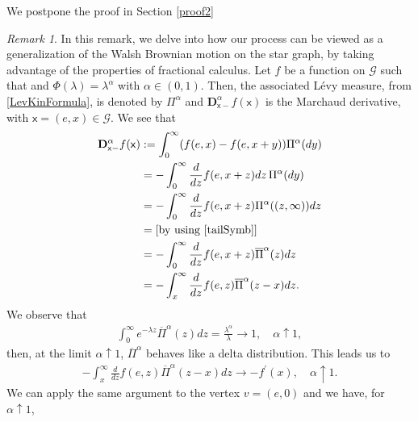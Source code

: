 \documentclass[11pt,a4paper]{article}
\theoremstyle{plain}
\theoremstyle{definition}
\theoremstyle{remark}
\newtheorem{remark}{Remark}
\begin{document}
		We postpone the proof in Section \ref{proof2}
		\begin{remark}
			In this remark, we delve into how our process can be viewed as a generalization of the Walsh Brownian motion on the star graph, by taking advantage of the properties of fractional calculus.
			Let $f$ be a function on $\mathcal{G}$ such that  and $\Phi(\lambda)=\lambda^\alpha$ with $\alpha \in (0,1)$. Then, the associated L\'evy measure, from \eqref{LevKinFormula}, is denoted by $\Pi^\alpha$ and $\mathbf{D}_{\mathsf{x}-}^\alpha f(\mathsf{x})$ is the Marchaud derivative, with $\mathsf{x}=(e,x) \in \mathcal{G}$. We see that
			\begin{align*}
				\mathbf{D}_{\mathsf{x}-}^\alpha f(\mathsf{x})&:=\int_{0}^{\infty} (f(e,x) - f(e,x+y))\Pi^\alpha(dy)\\
				&=- \int_{0}^{\infty} \frac{d}{dz} f(e,x+z) dz \, \Pi^\alpha(dy)\\
				&=-\int_{0}^{\infty} \frac{d}{dz} f(e,x+z) \Pi^\alpha((z,\infty)) dz\\
				&=\text{[by using \eqref{tailSymb}]}\\
				&=-\int_{0}^{\infty} \frac{d}{dz} f(e,x+z) \overline{\Pi}^\alpha (z) dz\\
				&=-\int_{x}^{\infty} \frac{d}{dz} f(e,z) \overline{\Pi}^\alpha(z-x) dz.
			\end{align*}
			We observe that
			\begin{align*}
				\int_{0}^{\infty} e^{-\lambda z} \overline{\Pi}^\alpha(z) dz= \frac{\lambda^\alpha}{\lambda} \longrightarrow 1, \quad {\alpha \uparrow 1},
			\end{align*}
			then, at the limit $\alpha \uparrow 1$, $\overline{\Pi}^\alpha$ behaves like a delta distribution. This leads us to
			\begin{align*}
				-\int_{x}^{\infty} \frac{d}{dz} f(e,z) \overline{\Pi}^\alpha(z-x) dz \longrightarrow - f^\prime(x), \quad \alpha \uparrow 1.
			\end{align*}
			We can apply the same argument to the vertex $v=(e,0)$ and we have, for $\alpha \uparrow 1$,
			\begin{align*}

\end{align*}
\end{remark}
\end{document}
